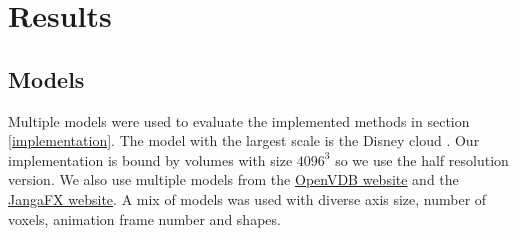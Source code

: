 \section{Results} \label{results}

\subsection{Models} \label{results:models}
Multiple models were used to evaluate the implemented methods in section \ref{implementation}. The model with the largest scale is the Disney cloud \cite{DisneyCloud}. Our implementation is bound by volumes with size $4096^3$ so we use the half resolution version. We also use multiple models from the \href{https://www.openvdb.org/download/}{OpenVDB website} and the \href{https://jangafx.com/software/embergen/download/free-vdb-animations/}{JangaFX website}. A mix of models was used with diverse axis size, number of voxels, animation frame number and shapes. 

